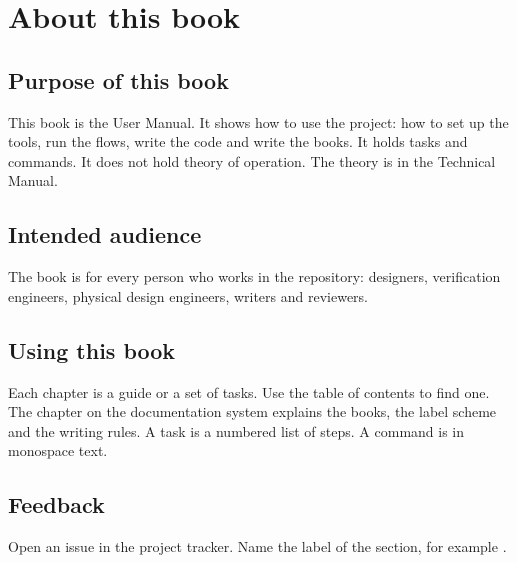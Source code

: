 \chapter*{About this book}
{}
\label{um:ch:about}

\section*{Purpose of this book}
This book is the User Manual. It shows how to use the project: how to set up the tools, run the flows, write the code and write the books. It holds tasks and commands. It does not hold theory of operation. The theory is in the Technical Manual.


\section*{Intended audience}
The book is for every person who works in the repository: designers, verification engineers, physical design engineers, writers and reviewers.

\section*{Using this book}
Each chapter is a guide or a set of tasks. Use the table of contents to find one. The chapter on the documentation system explains the books, the label scheme and the writing rules. A task is a numbered list of steps. A command is in monospace text.



\section*{Feedback}
Open an issue in the project tracker. Name the label of the section, for example .

